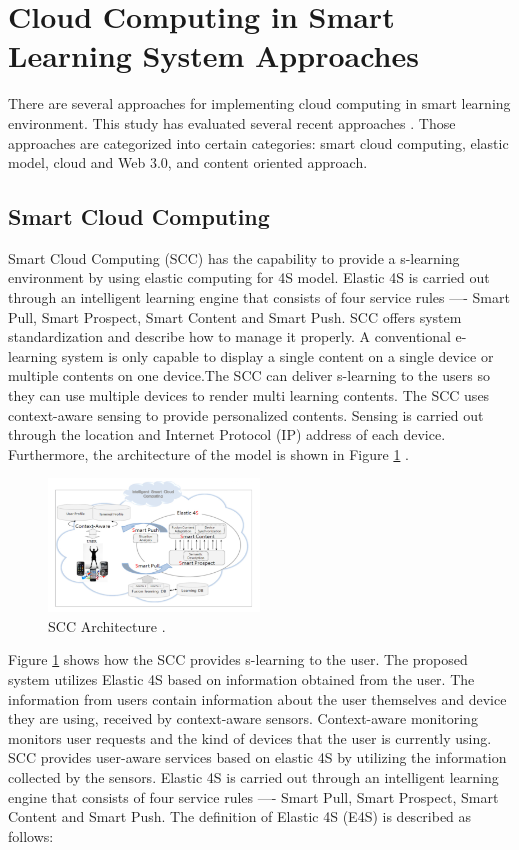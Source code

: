 \documentclass[journal]{vgtc}
\begin{document}
\section{Cloud Computing in Smart Learning System Approaches}
There are several approaches for implementing cloud computing in smart learning environment. This study has evaluated several recent approaches \cite{Kim2013,s110807835,jeong2013content,jeong2013cloud,nasr2012proposed}. Those approaches are categorized into certain categories: smart cloud computing, elastic model, cloud and Web 3.0, and content oriented approach.
  
  \subsection{Smart Cloud Computing}
  Smart Cloud Computing (SCC) has the capability to provide a s-learning environment by using elastic computing for 4S model. Elastic 4S is carried out through an intelligent learning engine that consists of four service rules —- Smart Pull, Smart Prospect, Smart Content and Smart Push. SCC offers system standardization and describe how to manage it properly. A conventional e-learning system is only capable to display a single content on a single device or multiple contents on one device.The SCC can deliver s-learning to the users so they can use multiple devices to render multi learning contents. The SCC uses context-aware sensing to provide personalized contents. Sensing is carried out through the location and Internet Protocol (IP) address of each device. Furthermore, the architecture of the model is shown in Figure \ref{scc} \cite{s110807835}.

  \begin{figure}[t]
    \centering
    \includegraphics[width=0.5\textwidth]{scc}
    \caption{SCC Architecture \cite{s110807835}.}
    \label{scc}
  \end{figure}

  Figure \ref{scc} shows how the SCC provides s-learning to the user. The proposed system utilizes Elastic 4S based on information obtained from the user. The information from users contain information about the user themselves and device they are using, received by context-aware sensors. Context-aware monitoring monitors user requests and the kind of devices that the user is currently using. SCC provides user-aware services based on elastic 4S by utilizing the information collected by the sensors. Elastic 4S is carried out through an intelligent learning engine that consists of four service rules —- Smart Pull, Smart Prospect, Smart Content and Smart Push. The definition of Elastic 4S (E4S) is described as follows:
\end{document}
